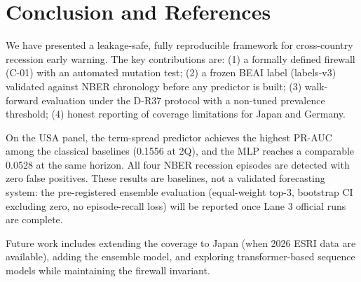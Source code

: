 \documentclass[conference]{IEEEtran}
\begin{document}
\section{Conclusion and References}

We have presented a leakage-safe, fully reproducible framework for cross-country
recession early warning. The key contributions are: (1) a formally defined
firewall (C-01) with an automated mutation test; (2) a frozen BEAI label
(labels-v3) validated against NBER chronology before any predictor is built;
(3) walk-forward evaluation under the D-R37 protocol with a non-tuned prevalence
threshold; (4) honest reporting of coverage limitations for Japan and Germany.

On the USA panel, the term-spread predictor achieves the highest PR-AUC among
the classical baselines (0.1556 at 2Q), and the MLP reaches a comparable
0.0528 at the same horizon. All four NBER recession episodes are
detected with zero false positives. These results are baselines, not a validated
forecasting system: the pre-registered ensemble evaluation (equal-weight top-3,
bootstrap CI excluding zero, no episode-recall loss) will be reported once
Lane 3 official runs are complete.

Future work includes extending the coverage to Japan (when 2026 ESRI data are
available), adding the ensemble model, and exploring transformer-based sequence
models while maintaining the firewall invariant.



\end{document}
